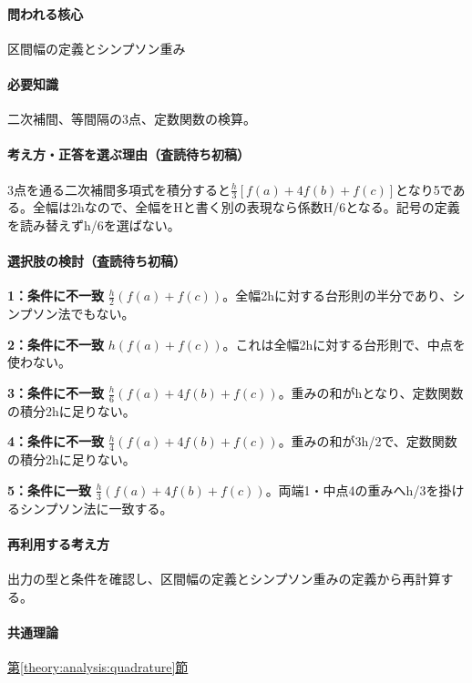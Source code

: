 \paragraph{問われる核心} 区間幅の定義とシンプソン重み

\paragraph{必要知識} 二次補間、等間隔の3点、定数関数の検算。

\paragraph{考え方・正答を選ぶ理由（査読待ち初稿）} 3点を通る二次補間多項式を積分すると\(\frac h3[f(a)+4f(b)+f(c)]\)となり5である。全幅は2hなので、全幅をHと書く別の表現なら係数H/6となる。記号の定義を読み替えずh/6を選ばない。

\paragraph{選択肢の検討（査読待ち初稿）}\mbox{}\par

\noindent\textbf{1：条件に不一致} \(\frac h2(f(a)+f(c))\)。全幅2hに対する台形則の半分であり、シンプソン法でもない。\par

\noindent\textbf{2：条件に不一致} \(h(f(a)+f(c))\)。これは全幅2hに対する台形則で、中点を使わない。\par

\noindent\textbf{3：条件に不一致} \(\frac h6(f(a)+4f(b)+f(c))\)。重みの和がhとなり、定数関数の積分2hに足りない。\par

\noindent\textbf{4：条件に不一致} \(\frac h4(f(a)+4f(b)+f(c))\)。重みの和が3h/2で、定数関数の積分2hに足りない。\par

\noindent\textbf{5：条件に一致} \(\frac h3(f(a)+4f(b)+f(c))\)。両端1・中点4の重みへh/3を掛けるシンプソン法に一致する。\par

\paragraph{再利用する考え方} 出力の型と条件を確認し、区間幅の定義とシンプソン重みの定義から再計算する。

\paragraph{共通理論} \hyperref[theory:analysis:quadrature]{第\ref*{theory:analysis:quadrature}節}

